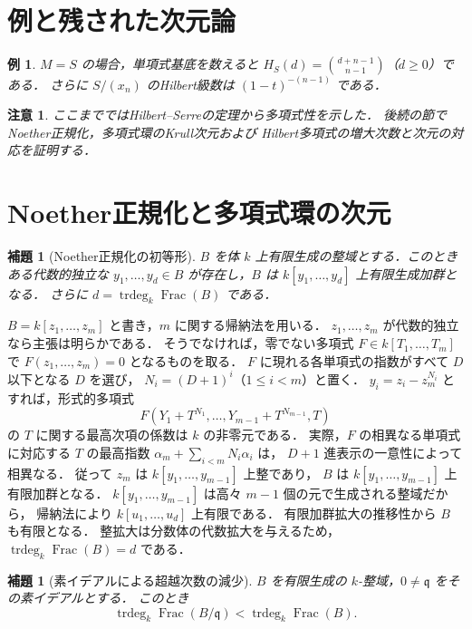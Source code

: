 \documentclass[a5paper,10pt,onecolumn]{jsarticle}
\makeatletter
\theoremstyle{mathnotetheorem}
\newtheorem{lemma}[theorem]{補題}
\newtheorem{example}[theorem]{例}
\newtheorem{remark}[theorem]{注意}
\renewcommand{\proofname}{証明}
\renewenvironment{proof}[1][\proofname]{%
  \par\pushQED{\qed}\normalfont\topsep4\p@\@plus2\p@\relax
  \trivlist\item[\hskip\labelsep\bfseries #1]\ignorespaces
}{\popQED\endtrivlist\@endpefalse}
\makeatother
\begin{document}
\section{例と残された次元論}
\begin{example}
$M=S$ の場合，単項式基底を数えると
$H_S(d)={d+n-1\choose n-1}$（$d\ge0$）である．
さらに $S/(x_n)$ のHilbert級数は $(1-t)^{-(n-1)}$ である．
\end{example}
\begin{remark}
ここまでではHilbert--Serreの定理から多項式性を示した．
後続の節でNoether正規化，多項式環のKrull次元および
Hilbert多項式の増大次数と次元の対応を証明する．
\end{remark}


\section{Noether正規化と多項式環の次元}
\begin{lemma}[Noether正規化の初等形]\label{lem:nn}
$B$ を体 $k$ 上有限生成の整域とする．このときある代数的独立な
$y_1,\ldots,y_d\in B$ が存在し，$B$ は $k[y_1,\ldots,y_d]$ 上有限生成加群となる．
さらに $d=\operatorname{trdeg}_k\operatorname{Frac}(B)$ である．
\end{lemma}
\begin{proof}
$B=k[z_1,\ldots,z_m]$ と書き，$m$ に関する帰納法を用いる．
$z_1,\ldots,z_m$ が代数的独立なら主張は明らかである．
そうでなければ，零でない多項式 $F\in k[T_1,\ldots,T_m]$ で
$F(z_1,\ldots,z_m)=0$ となるものを取る．
$F$ に現れる各単項式の指数がすべて $D$ 以下となる $D$ を選び，
$N_i=(D+1)^i$（$1\le i<m$）と置く．
$y_i=z_i-z_m^{N_i}$ とすれば，形式的多項式
\[
 F(Y_1+T^{N_1},\ldots,Y_{m-1}+T^{N_{m-1}},T)
\]
の $T$ に関する最高次項の係数は $k$ の非零元である．
実際，$F$ の相異なる単項式に対応する
$T$ の最高指数 $\alpha_m+\sum_{i<m}N_i\alpha_i$ は，
$D+1$ 進表示の一意性によって相異なる．
従って $z_m$ は $k[y_1,\ldots,y_{m-1}]$ 上整であり，
$B$ は $k[y_1,\ldots,y_{m-1}]$ 上有限加群となる．
$k[y_1,\ldots,y_{m-1}]$ は高々 $m-1$ 個の元で生成される整域だから，
帰納法により $k[u_1,\ldots,u_d]$ 上有限である．
有限加群拡大の推移性から $B$ も有限となる．
整拡大は分数体の代数拡大を与えるため，
$\operatorname{trdeg}_k\operatorname{Frac}(B)=d$ である．
\end{proof}
\begin{lemma}[素イデアルによる超越次数の減少]\label{lem:trdrop}
$B$ を有限生成の $k$-整域，$0\ne\mathfrak q$ をその素イデアルとする．
このとき
\[
 \operatorname{trdeg}_k\operatorname{Frac}(B/\mathfrak q)
 <\operatorname{trdeg}_k\operatorname{Frac}(B).
\]
\end{lemma}
\end{document}
